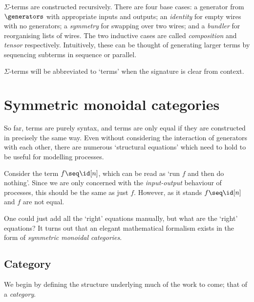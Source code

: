 \(\Sigma\)-terms are constructed recursively.
There are four base cases: a generator from \(\generators\) with appropriate
inputs and outputs;
an \emph{identity} for empty wires with no generators;
a \emph{symmetry} for swapping over two wires;
and a \emph{bundler} for reorganising lists of wires.
The two inductive cases are called \emph{composition} and \emph{tensor}
respectively.
Intuitively, these can be thought of generating larger terms by sequencing
subterms in sequence or parallel.

\(\Sigma\)-terms will be abbreviated to `terms' when the signature is clear from
context.

\section{Symmetric monoidal categories}

So far, terms are purely syntax, and terms are only equal if they are
constructed in precisely the same way.
Even without considering the interaction of generators with each other, there
are numerous `structural equations' which need to hold to be useful for
modelling processes.

\begin{example}
    Consider the term \(f \seq \id[n]\), which can be read as `run \(f\) and
    then do nothing'.
    Since we are only concerned with the \emph{input-output} behaviour of
    processes, this should be the same as just \(f\).
    However, as it stands \(f \seq \id[n]\) and \(f\) are not equal.
\end{example}

One could just add all the `right' equations manually, but what are the `right'
equations?
It turns out that an elegant mathematical formalism exists in the form of
\emph{symmetric monoidal categories}.

\subsection{Category}

We begin by defining the structure underlying much of the work to come; that of
a \emph{category}.

